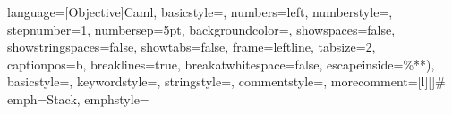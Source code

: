 \usepackage[backend=bibtex]{biblatex}

\usepackage{fullpage}
\usepackage[english]{babel}
\usepackage[utf8]{inputenc}
\usepackage[T1]{fontenc}
\usepackage{lmodern}
\usepackage[onelanguage,boxed]{algorithm2e}
\usepackage{graphicx}
\usepackage{float}
\usepackage{amsmath}
\usepackage{amsfonts}
\usepackage{amsthm}
\usepackage{color}
\usepackage[usenames,dvipsnames]{xcolor}
\usepackage{listings}
\usepackage{tikz}
\usepackage{subfigure}
\usepackage{wrapfig}
\usepackage{hyperref}
\hypersetup{colorlinks,linkcolor=black,urlcolor=blue}
\usepackage[font=small,labelfont=bf]{caption}
\newtheorem {myDef} {Definition}
\newtheorem {myTh}{Theorem}
\lstset
{
  language=[Objective]Caml,
  basicstyle=\footnotesize,       %
  numbers=left,                   %
  numberstyle=\footnotesize,      %
  stepnumber=1,                   %
  numbersep=5pt,                  %
  backgroundcolor=\color{white},  %
  showspaces=false,               %
  showstringspaces=false,         %
  showtabs=false,                 %
  frame=leftline,           %
  tabsize=2,          %
  captionpos=b,           %
  breaklines=true,        %
  breakatwhitespace=false,    %
  escapeinside={\%*}{*)},          %
  basicstyle=\ttfamily,
  keywordstyle=\color{BurntOrange}\ttfamily,
  stringstyle=\color{red}\ttfamily,
  commentstyle=\color{LimeGreen}\ttfamily,
  morecomment=[l][\color{RoyalBlue}]{\#}
}
\lstset
{
  emph={Stack},
  emphstyle={\color{DarkOrchid}}
}



